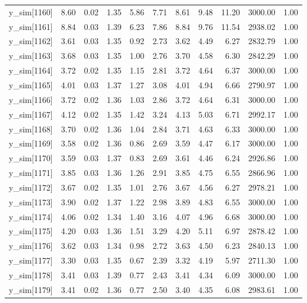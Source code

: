 \begin{table}[ht]
\begin{tabular}{rrrrrrrrrrr}
  y\_sim[1160] & 8.60 & 0.02 & 1.35 & 5.86 & 7.71 & 8.61 & 9.48 & 11.20 & 3000.00 & 1.00 \\ 
  y\_sim[1161] & 8.84 & 0.03 & 1.39 & 6.23 & 7.86 & 8.84 & 9.76 & 11.54 & 2938.02 & 1.00 \\ 
  y\_sim[1162] & 3.61 & 0.03 & 1.35 & 0.92 & 2.73 & 3.62 & 4.49 & 6.27 & 2832.79 & 1.00 \\ 
  y\_sim[1163] & 3.68 & 0.03 & 1.35 & 1.00 & 2.76 & 3.70 & 4.58 & 6.30 & 2842.29 & 1.00 \\ 
  y\_sim[1164] & 3.72 & 0.02 & 1.35 & 1.15 & 2.81 & 3.72 & 4.64 & 6.37 & 3000.00 & 1.00 \\ 
  y\_sim[1165] & 4.01 & 0.03 & 1.37 & 1.27 & 3.08 & 4.01 & 4.94 & 6.66 & 2790.97 & 1.00 \\ 
  y\_sim[1166] & 3.72 & 0.02 & 1.36 & 1.03 & 2.86 & 3.72 & 4.64 & 6.31 & 3000.00 & 1.00 \\ 
  y\_sim[1167] & 4.12 & 0.02 & 1.35 & 1.42 & 3.24 & 4.13 & 5.03 & 6.71 & 2992.17 & 1.00 \\ 
  y\_sim[1168] & 3.70 & 0.02 & 1.36 & 1.04 & 2.84 & 3.71 & 4.63 & 6.33 & 3000.00 & 1.00 \\ 
  y\_sim[1169] & 3.58 & 0.02 & 1.36 & 0.86 & 2.69 & 3.59 & 4.47 & 6.17 & 3000.00 & 1.00 \\ 
  y\_sim[1170] & 3.59 & 0.03 & 1.37 & 0.83 & 2.69 & 3.61 & 4.46 & 6.24 & 2926.86 & 1.00 \\ 
  y\_sim[1171] & 3.85 & 0.03 & 1.36 & 1.26 & 2.91 & 3.85 & 4.75 & 6.55 & 2866.96 & 1.00 \\ 
  y\_sim[1172] & 3.67 & 0.02 & 1.35 & 1.01 & 2.76 & 3.67 & 4.56 & 6.27 & 2978.21 & 1.00 \\ 
  y\_sim[1173] & 3.90 & 0.02 & 1.37 & 1.22 & 2.98 & 3.89 & 4.83 & 6.55 & 3000.00 & 1.00 \\ 
  y\_sim[1174] & 4.06 & 0.02 & 1.34 & 1.40 & 3.16 & 4.07 & 4.96 & 6.68 & 3000.00 & 1.00 \\ 
  y\_sim[1175] & 4.20 & 0.03 & 1.36 & 1.51 & 3.29 & 4.20 & 5.11 & 6.97 & 2878.42 & 1.00 \\ 
  y\_sim[1176] & 3.62 & 0.03 & 1.34 & 0.98 & 2.72 & 3.63 & 4.50 & 6.23 & 2840.13 & 1.00 \\ 
  y\_sim[1177] & 3.30 & 0.03 & 1.35 & 0.67 & 2.39 & 3.32 & 4.19 & 5.97 & 2711.30 & 1.00 \\ 
  y\_sim[1178] & 3.41 & 0.03 & 1.39 & 0.77 & 2.43 & 3.41 & 4.34 & 6.09 & 3000.00 & 1.00 \\ 
  y\_sim[1179] & 3.41 & 0.02 & 1.36 & 0.77 & 2.50 & 3.40 & 4.35 & 6.08 & 2983.61 & 1.00 \\ 

\end{tabular}
\end{table}
